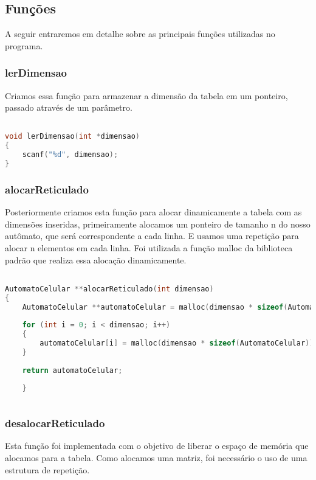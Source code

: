 \documentclass{article}
\begin{document}
\subsection{Funções}

A seguir entraremos em detalhe sobre as principais funções utilizadas no programa.

\subsubsection{lerDimensao}

Criamos essa função para armazenar a dimensão da tabela em um ponteiro, passado através de um parâmetro.

\begin{lstlisting}[caption={Função lerDimensao},label={lst:cod2},language=C]

void lerDimensao(int *dimensao)
{
    scanf("%d", dimensao);
}

\end{lstlisting}

\subsubsection{alocarReticulado}

Posteriormente criamos esta função para alocar dinamicamente a tabela com as dimensões inseridas, primeiramente alocamos um ponteiro de tamanho n do nosso autômato, que será correspondente a cada linha. E usamos uma repetição para alocar n elementos em cada linha. Foi utilizada a função malloc da biblioteca padrão que realiza essa alocação dinamicamente.

\begin{lstlisting}[caption={Função alocarReticulado},label={lst:cod3},language=C]

AutomatoCelular **alocarReticulado(int dimensao)
{
    AutomatoCelular **automatoCelular = malloc(dimensao * sizeof(AutomatoCelular *));
    
    for (int i = 0; i < dimensao; i++)
    {
        automatoCelular[i] = malloc(dimensao * sizeof(AutomatoCelular));
    }
    
    return automatoCelular;
    
    }
    
    \end{lstlisting}

\subsubsection{desalocarReticulado}
Esta função foi implementada com o objetivo de liberar o espaço de memória que alocamos para a tabela. Como alocamos uma matriz, foi necessário o uso de uma estrutura de repetição.
\end{document}
